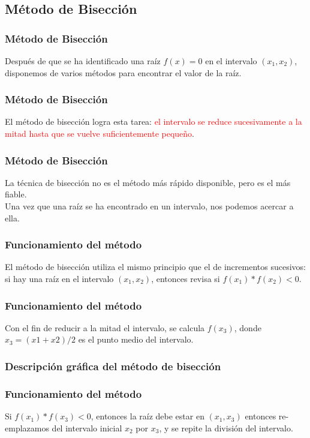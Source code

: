 \subsection{Método de Bisección}
\begin{frame}
\frametitle{Método de Bisección}
Después de que se ha identificado una raíz $f(x) = 0$ en el intervalo $(x_{1}, x_{2})$, disponemos de varios métodos para encontrar el valor de la raíz.
\end{frame}
\begin{frame}
\frametitle{Método de Bisección}
El método de bisección logra esta tarea: \textcolor{red}{el intervalo se reduce sucesivamente a la mitad  hasta que se vuelve suficientemente pequeño}. 
\end{frame}
\begin{frame}
\frametitle{Método de Bisección}
La técnica de bisección no es el método más rápido disponible, pero es el más fiable.
\\
\bigskip
Una vez que una raíz se ha encontrado en un intervalo, nos podemos acercar a ella.
\end{frame}
\begin{frame}
\frametitle{Funcionamiento del método}
El método de bisección utiliza el mismo principio que el de incrementos sucesivos: si hay una raíz en el intervalo $(x_{1}, x_{2})$, entonces revisa si $f(x_{1})*f(x_{2})<0$.
\end{frame}
\begin{frame}
\frametitle{Funcionamiento del método}
Con el fin de reducir a la mitad el intervalo, se calcula $f(x_{3})$, donde $x_{3} = (x1 + x2)/2$ es el punto medio del intervalo.
\end{frame}
\begin{frame}
\frametitle{Descripción gráfica del método de bisección}
\begin{figure}
	\centering
	
\end{figure}
\end{frame}
\begin{frame}
\frametitle{Funcionamiento del método}
Si $f(x_{1})*f(x_{3}) < 0$, entonces la raíz debe estar en $(x_{1}, x_{3})$ entonces re-emplazamos del intervalo inicial $x_{2}$ por $x_{3}$, y se repite la división del intervalo.
\pause
\begin{figure}
	\centering
	
\end{figure}
\end{frame}
